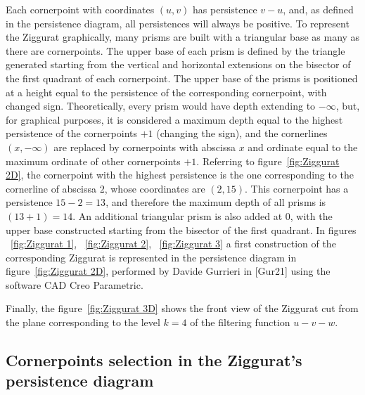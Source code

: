 \documentclass[english, LaM, oneside, noexaminfo]{sapthesis}
\begin{document}
Each cornerpoint with coordinates $(u, v)$ has persistence $v - u$, and, as defined in the persistence diagram, all persistences will always be positive.
To represent the Ziggurat graphically, many prisms are built with a
triangular base as many as there are cornerpoints. The upper base of each prism
is defined by the triangle generated starting from the vertical and
horizontal extensions on the bisector of the first quadrant of each cornerpoint. The upper base of the prisms is positioned at a height equal to the persistence of the
corresponding cornerpoint, with changed sign. Theoretically, every prism would have depth extending to $- \infty$, but, for graphical purposes, it is considered
a maximum depth equal to the highest persistence of the cornerpoints $+ 1$ (changing the sign), and the cornerlines $ (x, - \infty)$ are
replaced by cornerpoints with abscissa $x$ and ordinate equal to the maximum ordinate of other cornerpoints $+ 1$. Referring to figure~\ref{fig:Ziggurat 2D}, the
cornerpoint with the highest persistence is the one corresponding to the cornerline of abscissa $2$, whose coordinates are $(2, 15)$. This cornerpoint has a persistence 
$15-2 = 13$, and therefore the maximum depth of all prisms is $(13 + 1) =  14$.
An additional triangular prism is also added at $0$, with the upper base
constructed starting from the bisector of the first quadrant. In 
figures ~\ref{fig:Ziggurat 1}, ~\ref{fig:Ziggurat 2}, ~\ref{fig:Ziggurat 3} a first construction of the corresponding Ziggurat is represented
in the persistence diagram in figure~\ref{fig:Ziggurat 2D}, performed by Davide Gurrieri in [Gur21] using the software
CAD Creo Parametric.

Finally, the figure~\ref{fig:Ziggurat 3D} shows the front view of the Ziggurat cut from the plane corresponding to the level $k = 4$ of the filtering function $u - v - w$.



\subsection{Cornerpoints selection in the Ziggurat's persistence diagram}

\label{Ziggurat selection}
\end{document}
